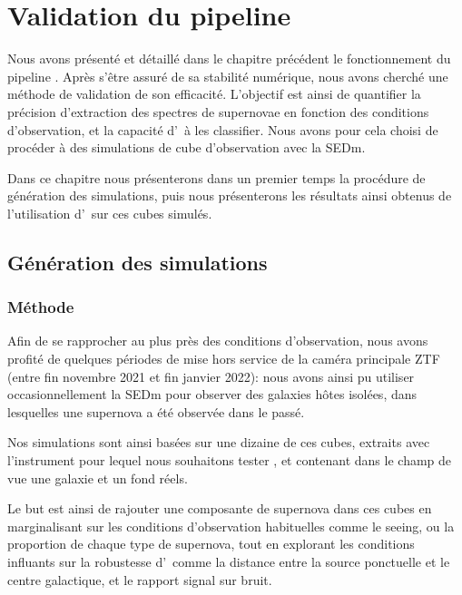 \documentclass[../main/main.tex]{subfiles}
\begin{document}
\setcounter{chapter}{7}
\chapter{Validation du pipeline
  \hypergal}\label{ch:simu}

\minitoc
\vspace{2cm}
Nous avons présenté et détaillé dans le chapitre précédent le
fonctionnement du pipeline \hypergal. Après s'être assuré de sa
stabilité numérique, nous avons cherché une méthode de validation de son
efficacité. L'objectif est ainsi de quantifier la précision d'extraction
des spectres de supernovae en fonction des conditions d'observation, et
la capacité d'\hypergal\ à les classifier.
Nous avons pour cela choisi de procéder à des simulations de cube
d'observation avec la SEDm.

Dans ce chapitre nous présenterons dans un premier temps la procédure de
génération des simulations, puis nous présenterons les résultats ainsi
obtenus de
l'utilisation d'\hypergal\ sur ces cubes simulés. 
\newpage

\section{Génération des simulations}

\subsection{Méthode}

Afin de se rapprocher au plus près des conditions d'observation, nous
avons profité de quelques périodes de mise hors service de la caméra
principale ZTF (entre fin novembre 2021 et fin janvier 2022): nous avons ainsi
pu utiliser occasionnellement la SEDm pour observer des galaxies hôtes isolées, dans
lesquelles une supernova a été observée dans le passé.

Nos simulations sont ainsi basées sur une dizaine de ces cubes, extraits
avec l'instrument pour lequel nous souhaitons tester \hypergal, et
contenant dans le champ de vue une galaxie et un fond réels.

Le but est ainsi de rajouter une composante de supernova dans ces
cubes en marginalisant sur les conditions d'observation habituelles
comme le seeing, ou la proportion de chaque type de supernova, tout en explorant
les conditions influants sur la robustesse d'\hypergal\ comme la distance
entre la source ponctuelle et le centre galactique, et le rapport signal
sur bruit.
\end{document}
